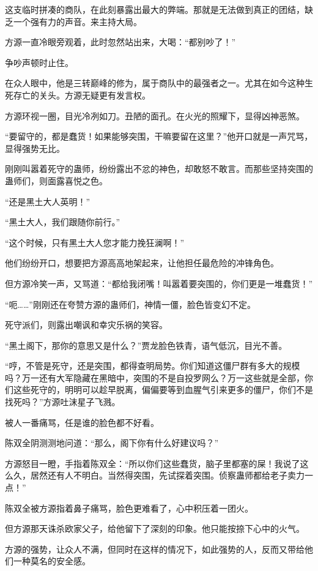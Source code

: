 \begin{this_body}
这支临时拼凑的商队，在此刻暴露出最大的弊端。那就是无法做到真正的团结，缺乏一个强有力的声音。来主持大局。

方源一直冷眼旁观着，此时忽然站出来，大喝：“都别吵了！”

争吵声顿时止住。

在众人眼中，他是三转巅峰的修为，属于商队中的最强者之一。尤其在如今这种生死存亡的关头。方源无疑更有发言权。

方源环视一圈，目光冷冽如刀。丑陋的面孔。在火光的照耀下，显得凶神恶煞。

“要留守的，都是蠢货！如果能够突围，干嘛要留在这里？”他开口就是一声咒骂，显得强势无比。

刚刚叫嚣着死守的蛊师，纷纷露出不忿的神色，却敢怒不敢言。而那些坚持突围的蛊师们，则面露喜悦之色。

“还是黑土大人英明！”

“黑土大人，我们跟随你前行。”

“这个时候，只有黑土大人您才能力挽狂澜啊！”

他们纷纷开口，想要把方源高高地架起来，让他担任最危险的冲锋角色。

但方源冷笑一声，又骂道：“都给我闭嘴！叫嚣着要突围的，你们更是一堆蠢货！”

“呃……”刚刚还在夸赞方源的蛊师们，神情一僵，脸色皆变幻不定。

死守派们，则露出嘲讽和幸灾乐祸的笑容。

“黑土阁下，那你的意思又是什么？”贾龙脸色铁青，语气低沉，目光不善。

“哼，不管是死守，还是突围，都得查明局势。你们知道这僵尸群有多大的规模吗？万一还有大军隐藏在黑暗中，突围的不是自投罗网么？万一这些就是全部，你们这些死守的，明明可以趁早脱离，偏偏要等到血腥气引来更多的僵尸，你们不是找死吗？”方源吐沫星子飞溅。

被人一番痛骂，任是谁的脸色都不好看。

陈双全阴测测地问道：“那么，阁下你有什么好建议吗？”

方源怒目一瞪，手指着陈双全：“所以你们这些蠢货，脑子里都塞的屎！我说了这么久，居然还有人不明白。当然得突围，先试探着突围。侦察蛊师都给老子卖力一点！”

陈双全被方源指着鼻子痛骂，脸色更难看了，心中积压着一团火。

但方源那天诛杀欧家父子，给他留下了深刻的印象。他只能按捺下心中的火气。

方源的强势，让众人不满，但同时在这样的情况下，如此强势的人，反而又带给他们一种莫名的安全感。


\end{this_body}
